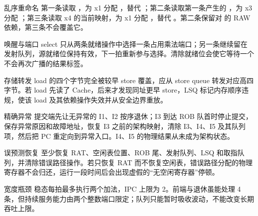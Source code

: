 \begin{chapteranswer}{乱序重命名}
第一条读取 ，为 x1 分配 ，替代 ；第二条读取第一条产生的 ，为 x3 分配 ；第三条读取 x4 的当前映射，为 x1 分配 ，替代 。第二条保留对  的 RAW 依赖，第三条不会覆盖它。
\end{chapteranswer}

\begin{chapteranswer}{唤醒与端口}
select 只从两条就绪操作中选择一条占用乘法端口；另一条继续留在发射队列，源就绪位保持有效，下一拍重新参与选择。清除就绪位会使它等待一个不会再次广播的结果标签。
\end{chapteranswer}

\begin{chapteranswer}{存储转发}
load 的四个字节完全被较早 store 覆盖，应从 store queue 转发对应高四字节。若 load 先读了 Cache，后来才发现同址更早 store，LSQ 标记内存顺序违规，使该 load 及其依赖操作失效并从安全边界重放。
\end{chapteranswer}

\begin{chapteranswer}{精确异常}
提交端先让无异常的 I1、I2 按序退休；I3 到达 ROB 队首时停止提交，保存异常原因和故障地址，恢复 I3 之前的架构映射，清除 I3、I4、I5 及其队列项，然后把 PC 重定向到异常入口。I4、I5 的物理结果从未成为架构状态。
\end{chapteranswer}

\begin{chapteranswer}{误预测恢复}
至少恢复 RAT、空闲表位置、ROB 尾、发射队列、LSQ 和取指队列，并清除错误路径操作。若只恢复 RAT 而不恢复空闲表，错误路径分配的物理寄存器不会归还，运行一段时间后会出现虚假的“无空闲寄存器”停顿。
\end{chapteranswer}

\begin{chapteranswer}{宽度瓶颈}
稳态每拍最多执行两个加法，IPC 上限为 2。前端与退休虽能处理 4 条，但持续服务能力由两个整数端口限定；队列只能暂时吸收波动，不能改变长期吞吐上限。
\end{chapteranswer}
